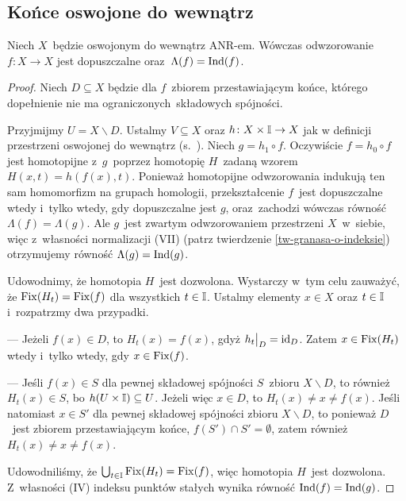 \subsection{Końce oswojone do wewnątrz}
\begin{tw}\label{tw-lefschetz_fpt_dla_reverse_tame}
Niech $X$~będzie oswojonym do wewnątrz \mbox{ANR-em}. Wówczas odwzorowanie $f\colon X\to X$ jest dopuszczalne oraz~$\Lambda(f)=\operatorname{Ind}(f)$.
\end{tw}
\begin{proof}
Niech $D\subseteq X$ będzie dla $f$~zbiorem przestawiającym końce, którego dopełnienie nie ma ograniczonych~składowych spójności.

Przyjmijmy $U=X\smallsetminus D$. Ustalmy $V\subseteq X$ oraz $h\colon X\times \mathbb{I}\to X$ jak w definicji przestrzeni oswojonej do wewnątrz (s.~\pageref{def-osw_do_wew}). Niech $g=h_1\circ f$. Oczywiście $f=h_0\circ f$ jest homotopijne z~$g$~poprzez homotopię $H$~zadaną wzorem $H(x,t)=h(f(x),t)$. Ponieważ homotopijne odwzorowania indukują ten sam homomorfizm na grupach homologii, przekształcenie $f$~jest dopuszczalne wtedy i~tylko wtedy, gdy dopuszczalne jest $g$, oraz~zachodzi wówczas równość $\Lambda(f)=\Lambda(g)$. Ale $g$~jest zwartym odwzorowaniem przestrzeni $X$~w~siebie, więc z~własności normalizacji (VII) (patrz twierdzenie \ref{tw-granasa-o-indeksie}) otrzymujemy równość $\Lambda(g)=\operatorname{Ind}(g)$.

Udowodnimy, że homotopia $H$~jest dozwolona. Wystarczy w~tym celu zauważyć, że $\operatorname{Fix}(H_t)=\operatorname{Fix}(f)$ dla wszystkich $t\in \mathbb{I}$. Ustalmy elementy $x\in X$ oraz $t\in\mathbb{I}$ i~rozpatrzmy dwa przypadki.
\begin{compactitem}
\item[---] Jeżeli $f(x)\in D$, to $H_t(x)=f(x)$, gdyż $h_t\big|_D=\operatorname{id}_D$. Zatem $x\in\operatorname{Fix}(H_t)$ wtedy i~tylko wtedy, gdy $x\in\operatorname{Fix}(f)$.
\item[---] Jeśli $f(x)\in S$ dla pewnej składowej spójności $S$~zbioru $X\smallsetminus D$, to również $H_t(x)\in S$, bo $h(U\times \mathbb{I})\subseteq U$. Jeżeli więc $x\in D$, to $H_t(x)\not=x\not=f(x)$. Jeśli natomiast $x\in S'$ dla pewnej składowej spójności zbioru $X\smallsetminus D$, to ponieważ $D$~jest zbiorem przestawiającym końce, $f\left(S'\right)\cap S'=\emptyset$, zatem również $H_t(x)\not=x\not=f(x)$.
\end{compactitem}
Udowodniliśmy, że $\bigcup_{t\in \mathbb{I}}\operatorname{Fix}(H_t)=\operatorname{Fix}(f)$, więc homotopia $H$~jest dozwolona. Z~własności (IV) indeksu punktów stałych wynika równość $\operatorname{Ind}(f)=\operatorname{Ind}(g)$.
\end{proof}

